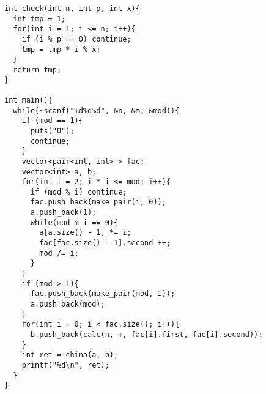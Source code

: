 \begin{verbatim}
int check(int n, int p, int x){
  int tmp = 1;
  for(int i = 1; i <= n; i++){
    if (i % p == 0) continue;
    tmp = tmp * i % x;
  }
  return tmp;
}

int main(){
  while(~scanf("%d%d%d", &n, &m, &mod)){
    if (mod == 1){
      puts("0");
      continue;
    }
    vector<pair<int, int> > fac;
    vector<int> a, b;
    for(int i = 2; i * i <= mod; i++){
      if (mod % i) continue;
      fac.push_back(make_pair(i, 0));
      a.push_back(1);
      while(mod % i == 0){
        a[a.size() - 1] *= i;
        fac[fac.size() - 1].second ++;
        mod /= i;
      }
    }
    if (mod > 1){
      fac.push_back(make_pair(mod, 1));
      a.push_back(mod);
    }
    for(int i = 0; i < fac.size(); i++){
      b.push_back(calc(n, m, fac[i].first, fac[i].second));
    }
    int ret = china(a, b);
    printf("%d\n", ret);
  }
}
\end{verbatim}
